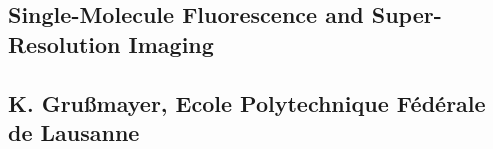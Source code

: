 \subsection*{Single-Molecule Fluorescence and Super-Resolution Imaging}
\subsection*{K. Gru\ss mayer, Ecole Polytechnique Fédérale de Lausanne}
\noindent 
